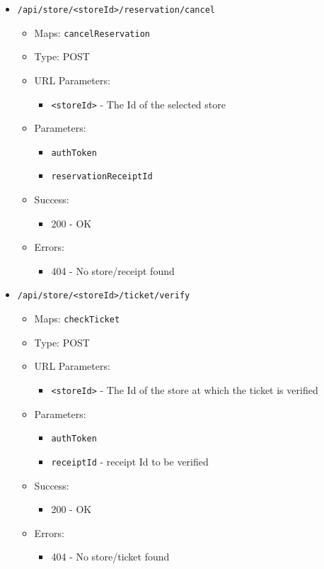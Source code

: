 \begin{itemize}
    \item \texttt{/api/store/<storeId>/reservation/cancel}
    \begin{itemize}
        \item Maps: \texttt{cancelReservation}
        \item Type: POST
        \item URL Parameters:
        \begin{itemize}
            \item \texttt{<storeId>} - The Id of the selected store
        \end{itemize}
        \item Parameters:
        \begin{itemize}
            \item \texttt{authToken}
            \item \texttt{reservationReceiptId}
        \end{itemize}
        \item Success:
        \begin{itemize}
            \item 200 - OK
        \end{itemize}
        \item Errors:
        \begin{itemize}
            \item 404 - No store/receipt found
        \end{itemize}
    \end{itemize}

    \item \texttt{/api/store/<storeId>/ticket/verify}
    \begin{itemize}
        \item Maps: \texttt{checkTicket}
        \item Type: POST
        \item URL Parameters:
        \begin{itemize}
            \item \texttt{<storeId>} - The Id of the store at which the ticket is verified
        \end{itemize}
        \item Parameters:
        \begin{itemize}
            \item \texttt{authToken}
            \item \texttt{receiptId} - receipt Id to be verified
        \end{itemize}
        \item Success:
        \begin{itemize}
            \item 200 - OK
        \end{itemize}
        \item Errors:
        \begin{itemize}
            \item 404 - No store/ticket found
        \end{itemize}
    \end{itemize}


\end{itemize}
